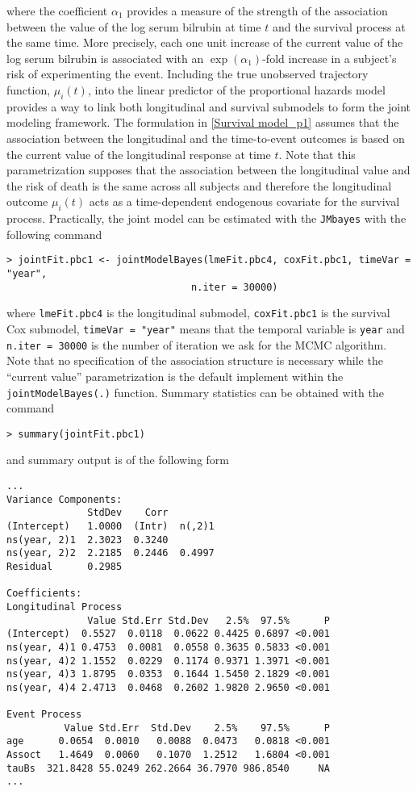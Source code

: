 \documentclass[12pt]{article}
\begin{document}
where the coefficient $\alpha_1$ provides a measure of the strength of the association between the value of the log serum bilrubin at time $t$ and the survival process at the same time. More precisely, each one unit increase of the current value of the log serum bilrubin is associated with an $\exp (\alpha_1)$-fold increase in a subject's risk of experimenting the event. Including the true unobserved trajectory function, $\mu_i(t)$, into the linear predictor of the proportional hazards model provides a way to link both longitudinal and survival submodels to form the joint modeling framework. The formulation in \eqref{Survival model_p1} assumes that the association between the longitudinal and the time-to-event outcomes is based on the current value of the longitudinal response at time $t$. Note that this parametrization supposes that the association between the longitudinal value and the risk of death is the same across all subjects and therefore the longitudinal outcome $\mu_i(t)$ acts as a time-dependent endogenous covariate for the survival process. Practically, the joint model can be estimated with the \texttt{JMbayes} with the following command
\begin{verbatim}
> jointFit.pbc1 <- jointModelBayes(lmeFit.pbc4, coxFit.pbc1, timeVar = "year",
                                n.iter = 30000)\end{verbatim}
where \texttt{lmeFit.pbc4} is the longitudinal submodel, \texttt{coxFit.pbc1} is the survival Cox submodel, \texttt{timeVar = "year"} means that the temporal variable is \texttt{year} and \texttt{n.iter = 30000} is the number of iteration we ask for the MCMC algorithm. Note that no specification of the association structure is necessary while the ``current value'' parametrization is the default implement within the \texttt{jointModelBayes(.)} function.
Summary statistics can be obtained with the command
\begin{verbatim}
> summary(jointFit.pbc1)
\end{verbatim}
and summary output is of the following form
\begin{verbatim}
...
Variance Components:
              StdDev    Corr
(Intercept)   1.0000  (Intr)  n(,2)1
ns(year, 2)1  2.3023  0.3240
ns(year, 2)2  2.2185  0.2446  0.4997
Residual      0.2985

Coefficients:
Longitudinal Process
              Value Std.Err Std.Dev   2.5%  97.5%      P
(Intercept)  0.5527  0.0118  0.0622 0.4425 0.6897 <0.001
ns(year, 4)1 0.4753  0.0081  0.0558 0.3635 0.5833 <0.001
ns(year, 4)2 1.1552  0.0229  0.1174 0.9371 1.3971 <0.001
ns(year, 4)3 1.8795  0.0353  0.1644 1.5450 2.1829 <0.001
ns(year, 4)4 2.4713  0.0468  0.2602 1.9820 2.9650 <0.001

Event Process
          Value Std.Err  Std.Dev    2.5%    97.5%      P
age      0.0654  0.0010   0.0088  0.0473   0.0818 <0.001
Assoct   1.4649  0.0060   0.1070  1.2512   1.6804 <0.001
tauBs  321.8428 55.0249 262.2664 36.7970 986.8540     NA
...
\end{verbatim}
\end{document}
